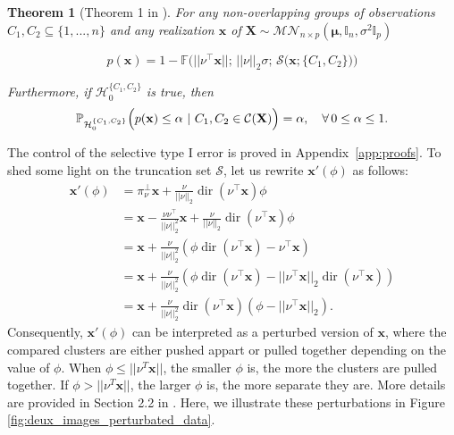 \documentclass[a4paper,11pt]{article}
\theoremstyle{plain}
\newcommand{\norm}[1]{||#1||}
\newcommand{\1}{\mathbf{1}}
\newcommand{\projnu}{\pi_{\nu}^{\perp}}
\newtheorem{theorem}{Theorem}
\begin{document}
\begin{theorem}[Theorem 1 in \cite{Gao}]\label{thm:1}
  For any non-overlapping groups of observations $C_1,C_2 \subseteq \{1,...,n\}$ and any realization $\mathbf{x}$ of $\mathbf{X} \sim \mathcal{MN}_{n \times p}(\mathbf{\mu},\mathbb{I}_n,\sigma^2\mathbb{I}_p)$

  \begin{equation}
    p(\mathbf{x}) = 1 - \mathbb{F}\bigl(\norm{\nu^\top \mathbf{x}};\,\norm{\nu}_2 \sigma;\,\mathcal{S}\bigl(\mathbf{x};\{C_1,C_2\}\bigr)\bigr)
  \end{equation}


  Furthermore, if $\mathcal{H}_0^{\{C_1,C_2\}}$ is true, then
  \begin{equation}\label{riskcontrol}
    \mathbb{P}_{\mathcal{H}_0^{\{C_1,C_2\}}}\Bigl(p(\mathbf{x}) \leq \alpha ~|~ C_1,C_2 \in \mathcal{C}(\mathbf{X})\Bigr) = \alpha,\quad \forall\, 0 \leq \alpha \leq 1.
  \end{equation}

\end{theorem}
The control of the selective type I error is proved in Appendix~\ref{app:proofs}. To shed some light on the truncation set $\mathcal{S}$, let us rewrite $\mathbf{x}'(\phi)$ as follows:
\begin{equation}
  \begin{aligned}
    \mathbf{x}'(\phi) &= \projnu \mathbf{x} + \frac{\nu}{\norm{\nu}_2} \operatorname{dir}(\nu^\top \mathbf{x}) \phi \\
                      &= \mathbf{x} - \frac{\nu \nu^\top}{\norm{\nu}_2^2}\mathbf{x} + \frac{\nu}{\norm{\nu}_2}\operatorname{dir}(\nu^\top \mathbf{x})\phi \\
                      &= \mathbf{x} + \frac{\nu}{\norm{\nu}_2^2}(\phi \operatorname{dir}(\nu^\top \mathbf{x}) - \nu^\top \mathbf{x}) \\
                      &= \mathbf{x} + \frac{\nu}{\norm{\nu}_2^2}(\phi \operatorname{dir}(\nu^\top \mathbf{x}) - \norm{\nu^\top \mathbf{x}}_2 \operatorname{dir}(\nu^\top \mathbf{x}) ) \\
                      &= \mathbf{x} + \frac{\nu}{\norm{\nu}_2^2}\operatorname{dir}(\nu^\top \mathbf{x})(\phi - \norm{\nu^\top \mathbf{x}}_2).
  \end{aligned}
\end{equation}
Consequently, $\mathbf{x}'(\phi)$ can be interpreted as a perturbed version of $\mathbf{x}$, where the compared clusters are either pushed appart or pulled together depending on the value of $\phi$. When $\phi\leq\norm{\nu^T\mathbf{x}}$, the smaller $\phi$ is, the more the clusters are pulled together. If $\phi>\norm{\nu^T\mathbf{x}}$, the larger $\phi$ is, the more separate they are. More details are provided in Section 2.2 in \cite{Gao}. Here, we illustrate these perturbations in Figure \ref{fig:deux_images_perturbated_data}.
\end{document}
